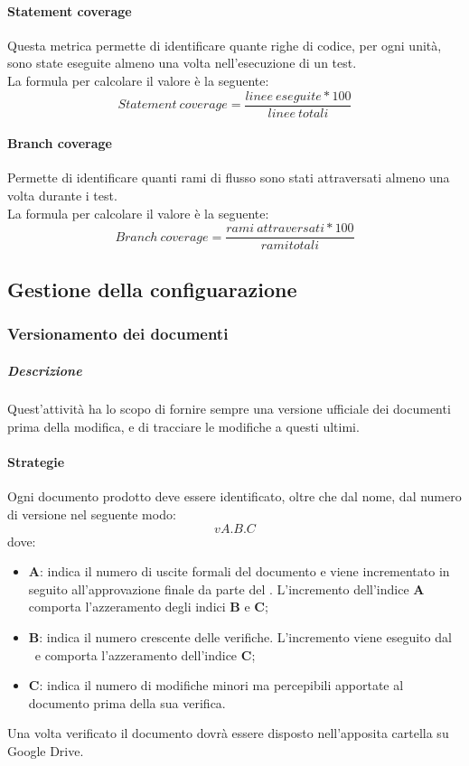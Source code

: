 \documentclass[../NormeDiProgetto_v4.0.0.tex]{subfiles}
\begin{document}
				\paragraph{Statement coverage}
				Questa metrica permette di identificare quante righe di codice, per ogni unità, sono state eseguite almeno una volta nell'esecuzione di un test.\\La formula per calcolare il valore è la seguente:
				\begin{equation*}
					Statement \ coverage = \frac{linee \ eseguite * 100}{linee \ totali}
				\end{equation*}
				
				\paragraph{Branch coverage}
				Permette di identificare quanti rami di flusso sono stati attraversati almeno una volta durante i test.\\La formula per calcolare il valore è la seguente:
				\begin{equation*}
					Branch \ coverage = \frac{rami \ attraversati* 100}{rami totali}
				\end{equation*}

		\subsection{Gestione della configuarazione}
			\subsubsection{Versionamento dei documenti}
				\subparagraph{Descrizione}
					Quest'attività ha lo scopo di fornire sempre una versione ufficiale dei documenti prima della modifica, e di tracciare le modifiche a questi ultimi.
				
				\paragraph{Strategie}
				Ogni documento prodotto deve essere identificato, oltre che dal nome, dal numero
				di versione nel seguente modo:
				\begin{equation*}
					vA.B.C
				\end{equation*}
				dove:
				\begin{itemize}
				\item \textbf{A}: indica il numero di uscite formali del documento e viene
				incrementato in seguito all'approvazione finale da parte del \responsabilediprogetto.
				L'incremento dell'indice \textbf{A} comporta l'azzeramento degli indici
				\textbf{B} e \textbf{C};
				\item \textbf{B}: indica il numero crescente delle verifiche. L'incremento viene eseguito dal \verificatore\ e comporta l'azzeramento dell'indice \textbf{C};
				\item \textbf{C}: indica il numero di modifiche minori ma percepibili apportate al documento prima della sua verifica.
				\end{itemize}
				Una volta verificato il documento dovrà essere disposto nell'apposita cartella su Google Drive.
\end{document}
